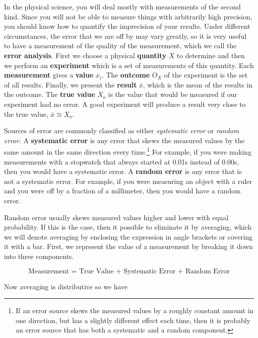 In the physical science, you will deal mostly with measurements of the second kind. Since you will not be able to measure things with arbitrarily high precision, you should know how to quantify the imprecision of your results.
 Under different circumstances, the error that we are off by may vary greatly, so it is very useful to have a measurement of the quality of the measurement, which we call the {\bf error analysis}. First we choose a physical {\bf quantity} $X$ to determine and then we perform an {\bf experiment} which is a set of measurements of this quantity. Each {\bf measurement} gives a {\bf value} $x_i$. The {\bf outcome} $O_X$ of the experiment is the set of all results. Finally, we present the {\bf result} $\bar{x}$, which is the mean of the results in the outcome. The {\bf true value} $X_o$ is the value that would be measured if our experiment had no error. A good experiment will produce a result very close to the true value, $\bar{x} \cong X_o$.

Sources of error are commonly classified as either {\it systematic error} or {\it random error}. A {\bf systematic error} is any error that skews the measured values by the same amount in the same direction every time.\footnote{If an error source skews the measured values by a roughly constant amount in one direction, but has a slightly different effect each time, then it is probably an error source that has both a systematic and a random component.} For example, if you were making measurements with a stopwatch that always started at 0.01s instead of 0.00s, then you would have a systematic error. A {\bf random error} is any error that is not a systematic error. For example, if you were measuring an object with a ruler and you were off by a fraction of a millimeter, then you would have a random error. 

Random error usually skews measured values higher and lower with equal probability. If this is the case, then it possible to eliminate it by averaging, which we will denote averaging by enclosing the expression in angle brackets or covering it with a bar. First, we represent the value of a measurement by breaking it down into three components.

\[\textrm{Measurement = True Value + Systematic Error + Random Error}\]

Now averaging is distributive so we have

